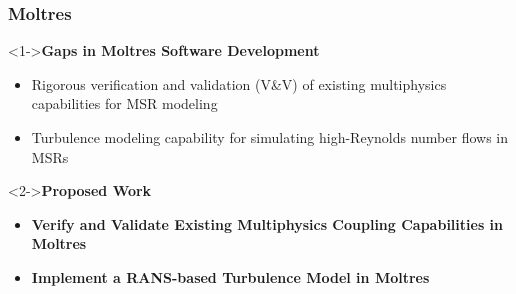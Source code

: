 \begin{frame}
  \frametitle{Moltres}
  \begin{block}<1->{\textbf{Gaps in Moltres Software Development}}
    \begin{itemize}
      \item Rigorous verification and validation (V\&V) of existing multiphysics capabilities for
        MSR modeling
      \item Turbulence modeling capability for simulating high-Reynolds number flows in MSRs
    \end{itemize}
  \end{block}
  \begin{block}<2->{\textbf{Proposed Work}}
    \begin{itemize}
      \item \textbf{Verify and Validate Existing Multiphysics Coupling Capabilities in Moltres}
      \item \textbf{Implement a RANS-based Turbulence Model in Moltres}
    \end{itemize}
  \end{block}
\end{frame}
